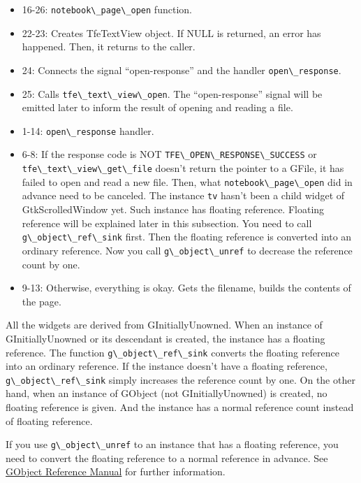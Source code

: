 \begin{itemize}
\tightlist
\item
  16-26: \passthrough{\lstinline!notebook\_page\_open!} function.
\item
  22-23: Creates TfeTextView object. If NULL is returned, an error has
  happened. Then, it returns to the caller.
\item
  24: Connects the signal ``open-response'' and the handler
  \passthrough{\lstinline!open\_response!}.
\item
  25: Calls \passthrough{\lstinline!tfe\_text\_view\_open!}. The
  ``open-response'' signal will be emitted later to inform the result of
  opening and reading a file.
\item
  1-14: \passthrough{\lstinline!open\_response!} handler.
\item
  6-8: If the response code is NOT
  \passthrough{\lstinline!TFE\_OPEN\_RESPONSE\_SUCCESS!} or
  \passthrough{\lstinline!tfe\_text\_view\_get\_file!} doesn't return
  the pointer to a GFile, it has failed to open and read a new file.
  Then, what \passthrough{\lstinline!notebook\_page\_open!} did in
  advance need to be canceled. The instance \passthrough{\lstinline!tv!}
  hasn't been a child widget of GtkScrolledWindow yet. Such instance has
  floating reference. Floating reference will be explained later in this
  subsection. You need to call
  \passthrough{\lstinline!g\_object\_ref\_sink!} first. Then the
  floating reference is converted into an ordinary reference. Now you
  call \passthrough{\lstinline!g\_object\_unref!} to decrease the
  reference count by one.
\item
  9-13: Otherwise, everything is okay. Gets the filename, builds the
  contents of the page.
\end{itemize}

All the widgets are derived from GInitiallyUnowned. When an instance of
GInitiallyUnowned or its descendant is created, the instance has a
floating reference. The function
\passthrough{\lstinline!g\_object\_ref\_sink!} converts the floating
reference into an ordinary reference. If the instance doesn't have a
floating reference, \passthrough{\lstinline!g\_object\_ref\_sink!}
simply increases the reference count by one. On the other hand, when an
instance of GObject (not GInitiallyUnowned) is created, no floating
reference is given. And the instance has a normal reference count
instead of floating reference.

If you use \passthrough{\lstinline!g\_object\_unref!} to an instance
that has a floating reference, you need to convert the floating
reference to a normal reference in advance. See
\href{https://developer-old.gnome.org/gobject/stable/gobject-The-Base-Object-Type.html\#gobject-The-Base-Object-Type.description}{GObject
Reference Manual} for further information.

